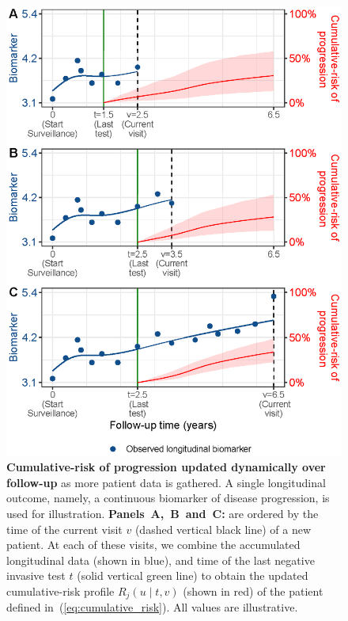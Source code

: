 \begin{figure}
\centerline{\includegraphics{images/dynrisk_plot_102.eps}}
\caption{\textbf{Cumulative-risk of progression updated dynamically over follow-up} as more patient data is gathered. A single longitudinal outcome, namely, a continuous biomarker of disease progression, is used for illustration. \textbf{Panels~A,~B~and~C:} are ordered by the time of the current visit $v$ (dashed vertical black line) of a new patient. At each of these visits, we combine the accumulated longitudinal data (shown in blue), and time of the last negative invasive test $t$ (solid vertical green line) to obtain the updated cumulative-risk profile $R_j(u \mid t, v)$ (shown in red) of the patient defined in~(\ref{eq:cumulative_risk}). All values are illustrative.}\label{fig:dynrisk_explanation}
\end{figure}

